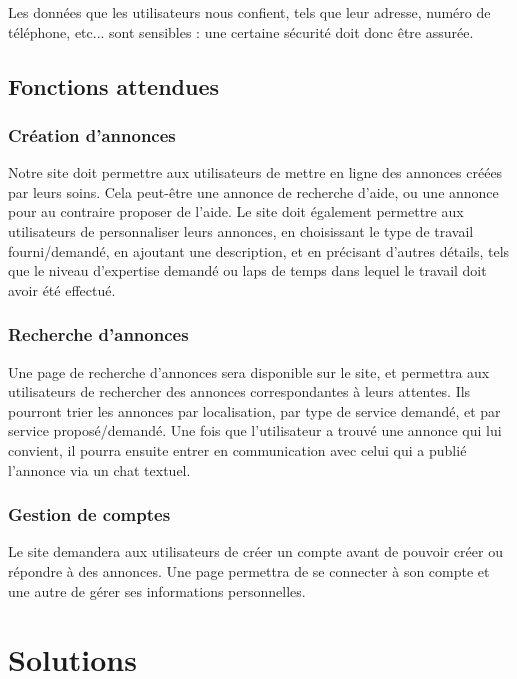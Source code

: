 \documentclass[a4paper,11pt]{article}
\begin{document}
Les données que les utilisateurs nous confient, tels que leur adresse, numéro de téléphone, etc... sont
sensibles : une certaine sécurité doit donc être assurée.\\

\subsection{Fonctions attendues}

\subsubsection{Création d’annonces}

Notre site doit permettre aux utilisateurs de mettre en ligne des annonces créées par leurs soins. Cela
peut-être une annonce de recherche d’aide, ou une annonce pour au contraire proposer de l’aide. Le
site doit également permettre aux utilisateurs de personnaliser leurs annonces, en choisissant le type
de travail fourni/demandé, en ajoutant une description, et en précisant d’autres détails, tels que le
niveau d’expertise demandé ou laps de temps dans lequel le travail doit avoir été effectué.\\

\subsubsection{Recherche d’annonces}

Une page de recherche d’annonces sera disponible sur le site, et permettra aux utilisateurs de
rechercher des annonces correspondantes à leurs attentes. Ils pourront trier les annonces par
localisation, par type de service demandé, et par service proposé/demandé. Une fois que l’utilisateur
a trouvé une annonce qui lui convient, il pourra ensuite entrer en communication avec celui qui a
publié l’annonce via un chat textuel.\\

\subsubsection{Gestion de comptes}

Le site demandera aux utilisateurs de créer un compte avant de pouvoir créer ou répondre à des
annonces. Une page permettra de se connecter à son compte et une autre de gérer ses informations
personnelles.\\

\section{Solutions}
\end{document}
